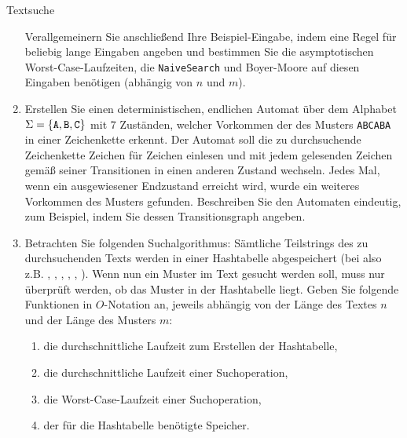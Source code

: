 \documentclass[11pt,a4paper]{article}
\begin{document}
\begin{aufgabe}{3}{Textsuche}
\begin{enumerate}[label=\alph*)]
        Verallgemeinern Sie anschließend Ihre Beispiel-Eingabe, indem eine Regel für beliebig lange  Eingaben angeben und bestimmen Sie die asymptotischen Worst-Case-Laufzeiten, die \texttt{NaiveSearch} und Boyer-Moore auf diesen Eingaben benötigen (abhängig von $n$ und $m$).

        \item \hard Erstellen Sie einen deterministischen, endlichen Automat über dem Alphabet $\Sigma = \{\text{\texttt{A}}, \text{\texttt{B}}, \text{\texttt{C}}\}$ mit 7 Zuständen, welcher Vorkommen der des Musters \texttt{ABCABA} in einer Zeichenkette erkennt.
        Der Automat soll die zu durchsuchende Zeichenkette Zeichen für Zeichen einlesen und mit jedem gelesenden Zeichen gemäß seiner Transitionen in einen anderen Zustand wechseln.
        Jedes Mal, wenn ein ausgewiesener Endzustand erreicht wird, wurde ein weiteres Vorkommen des Musters gefunden.
        Beschreiben Sie den Automaten eindeutig, zum Beispiel, indem Sie dessen Transitionsgraph angeben.
        \item \hard Betrachten Sie folgenden Suchalgorithmus:
        Sämtliche Teilstrings des zu durchsuchenden Texts werden in einer Hashtabelle abgespeichert (bei  also z.B. , , , , , ).
        Wenn nun ein Muster im Text gesucht werden soll, muss nur überprüft werden, ob das Muster in der Hashtabelle liegt.
        Geben Sie folgende Funktionen in $O$-Notation an, jeweils abhängig von der Länge des Textes $n$ und der Länge des Musters $m$:
        \begin{enumerate}[label=\roman*)]
            \item die durchschnittliche Laufzeit zum Erstellen der Hashtabelle,
            \item die durchschnittliche Laufzeit einer Suchoperation,
            \item die Worst-Case-Laufzeit einer Suchoperation,
            \item der für die Hashtabelle benötigte Speicher.
        \end{enumerate}
        \begin{description}

\end{description}
\end{enumerate}
\end{aufgabe}
\end{document}
